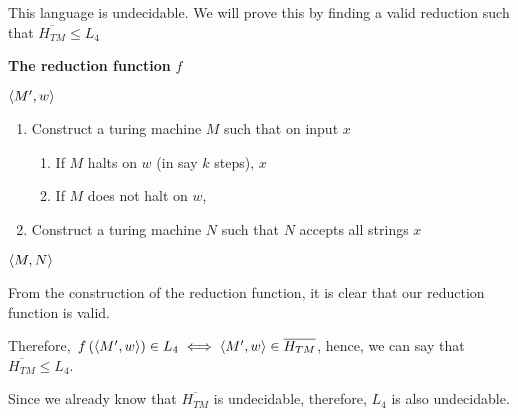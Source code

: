 \documentclass{article}
\begin{document}
\begin{question}
\begin{qpart}{4}
		This language is undecidable. We will prove this by finding a valid reduction such that $\overline{H_{TM}} \le L_4$ \br%

		\textbf{The reduction function} $f$ \br%

		 $\left\langle M^{\prime}, w \right\rangle$
		\begin{enumerate}[label= (\alph*) ]
			\item Construct a turing machine $M$ such that on input $x$
			\begin{enumerate}[label= (\roman*) ]
				\item If $M$ halts on $w$ (in say $k$ steps),  $x$
				\item If $M$ does not halt on $w$, 
			\end{enumerate}
			\item Construct a turing machine $N$ such that $N$ accepts all strings $x$
		\end{enumerate}
		 $\left\langle M, N \right\rangle$ \br%

		From the construction of the reduction function, it is clear that our reduction function is valid. \br%

		Therefore, $\func{f}{\angl{\pr{M}, w}} \in L_4 \iff \angl{\pr{M}, w} \in \overline{H_{TM}}$, hence, we can say that $\overline{H_{TM}} \le L_4$. \br%

		Since we already know that $\overline{H_{TM}}$ is undecidable, therefore, $L_4$ is also undecidable.

	\end{qpart}
\end{question}
\end{document}
